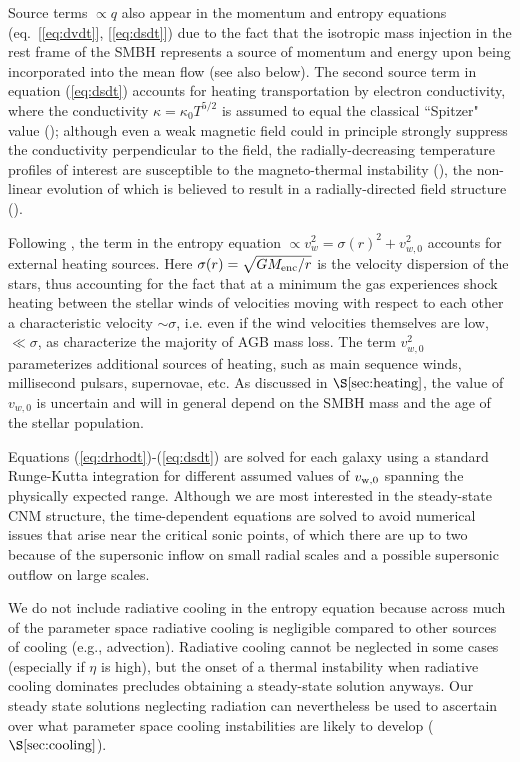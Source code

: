 \documentclass[usenatbib,fleqn]{mn2e}
\newcommand{\vw}{v_w}
\begin{document}
Source terms $\propto q$ also appear in the momentum and entropy equations (eq.~[\ref{eq:dvdt}], [\ref{eq:dsdt}]) due to the fact that the isotropic mass injection in the rest frame of the SMBH represents a source of momentum and energy upon being incorporated into the mean flow (see also below).  The second source term in equation (\ref{eq:dsdt}) accounts for heating transportation by electron conductivity, where the conductivity $\kappa = \kappa_0 T^{5/2}$ is assumed to equal the classical ``Spitzer" value (\citealt{Spitzer62}); although even a weak magnetic field could in principle strongly suppress the conductivity perpendicular to the field, the radially-decreasing temperature profiles of interest are susceptible to the magneto-thermal instability (\citealt{Balbus01}), the non-linear evolution of which is believed to result in a radially-directed field structure (\citealt{Parrish&Stone07}).  

Following \citet{ShcherbakovWong+:2014a}, the term in the entropy equation $\propto \vw^2 = \sigma(r)^2+v_{w,0}^2$ accounts for external heating sources.  Here $\sigma(r) = \sqrt{GM_{\rm enc}/r}$ is the velocity dispersion of the stars, thus accounting for the fact that at a minimum the gas experiences shock heating between the stellar winds of velocities moving with respect to each other a characteristic velocity $\sim \sigma$, i.e. even if the wind velocities themselves are low, $\ll \sigma$, as characterize the majority of AGB mass loss.  The term $v_{w,0}^{2}$ parameterizes additional sources of heating, such as main sequence winds, millisecond pulsars, supernovae, etc.  As discussed in $\S\ref{sec:heating}$, the value of $v_{w,0}$ is uncertain and will in general depend on the SMBH mass and the age of the stellar population. 

Equations (\ref{eq:drhodt})-(\ref{eq:dsdt}) are solved for each galaxy using a standard Runge-Kutta integration for different assumed values of $v_{\rm w,0}$ spanning the physically expected range.  Although we are most interested in the steady-state CNM structure, the time-dependent equations are solved to avoid numerical issues that arise near the critical sonic points, of which there are up to two because of the supersonic inflow on small radial scales and a possible supersonic outflow on large scales.  

We do not include radiative cooling in the entropy equation because across much of the parameter space radiative cooling is negligible compared to other sources of cooling (e.g., advection).  Radiative cooling cannot be neglected in some cases (especially if $\eta$ is high), but the onset of a thermal instability when radiative cooling dominates precludes obtaining a steady-state solution anyways.  Our steady state solutions neglecting radiation can nevertheless be used to ascertain over what parameter space cooling instabilities are likely to develop ($\S\ref{sec:cooling}$).  
\end{document}
